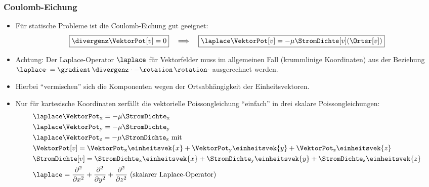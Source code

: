 \begin{frame}
  \frametitle{Coulomb-Eichung}
  \begin{itemize}[<+->]
  \item Für statische Probleme ist die \alert{Coulomb-Eichung} gut geeignet:
    $$
    \boxed{\divergenz\VektorPot[v] = 0} \quad \Longrightarrow \quad \boxed{\laplace \VektorPot[v]= -\mu \StromDichte[v](\Ortsr[v])}
    $$
  \item \alert{Achtung:} Der Laplace-Operator $\laplace$ für Vektorfelder muss im allgemeinen Fall (krummlinige Koordinaten) aus der Beziehung $\laplace \cdot = \gradient \, \divergenz \cdot - \rotation \, \rotation \cdot$ ausgerechnet werden.
  \item Hierbei \enquote{vermischen} sich die Komponenten wegen der Ortsabhängigkeit der Einheitsvektoren.
  \item \alert{Nur für kartesische Koordinaten} zerfällt die vektorielle Poissongleichung \enquote{einfach} in drei skalare Poissongleichungen:
    \begin{align*}
	& \laplace \VektorPot_\mathrm{x} = -\mu  \StromDichte_\mathrm{x}\\
	& \laplace \VektorPot_\mathrm{y} = -\mu  \StromDichte_\mathrm{y}\\
	& \laplace \VektorPot_\mathrm{z} = -\mu  \StromDichte_\mathrm{z} \text{ mit} \\
	& \VektorPot[v] = \VektorPot_\mathrm{x}  \einheitsvek{x} + \VektorPot_\mathrm{y}  \einheitsvek{y} + \VektorPot_\mathrm{z}  \einheitsvek{z}\\
	& \StromDichte[v] = \StromDichte_\mathrm{x}  \einheitsvek{x} + \StromDichte_\mathrm{y}  \einheitsvek{y} + \StromDichte_\mathrm{z}  \einheitsvek{z} \\
  &\laplace = \dfrac{\partial^2}{\partial x^2} + \dfrac{\partial^2}{\partial y^2} + \dfrac{\partial^2}{\partial z^2} \text{ (skalarer Laplace-Operator)}
\end{align*}

  \end{itemize}
\end{frame}


